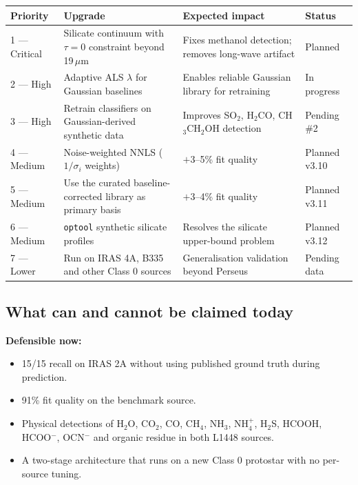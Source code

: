 \documentclass[11pt,a4paper]{article}
\newcommand{\um}{\,$\mu$m}
\newcommand{\code}[1]{\texttt{\small #1}}
\newcommand{\htwoo}{H$_2$O}
\newcommand{\cotwo}{CO$_2$}
\newcommand{\nhfour}{NH$_4^+$}
\newcommand{\ocn}{OCN$^-$}
\begin{document}
\begin{table}[H]
\centering
\small
\begin{tabular}{@{}L{2.4cm}L{4.8cm}L{4.9cm}L{2.3cm}@{}}
\toprule
\textbf{Priority} & \textbf{Upgrade} & \textbf{Expected impact} &
\textbf{Status} \\
 --- Critical & Silicate continuum with $\tau = 0$ constraint beyond
19\um & Fixes methanol detection; removes long-wave artifact & Planned \\
2 --- High & Adaptive ALS $\lambda$ for Gaussian baselines & Enables
reliable Gaussian library for retraining & In progress \\
3 --- High & Retrain classifiers on Gaussian-derived synthetic data &
Improves SO$_2$, H$_2$CO, CH$_3$CH$_2$OH detection & Pending \#2 \\
4 --- Medium & Noise-weighted NNLS ($1/\sigma_i$ weights) & $+3$--5\% fit
quality & Planned v3.10 \\
5 --- Medium & Use the curated baseline-corrected library as primary basis
& $+3$--4\% fit quality & Planned v3.11 \\
6 --- Medium & \code{optool} synthetic silicate profiles & Resolves the
silicate upper-bound problem & Planned v3.12 \\
7 --- Lower & Run on IRAS 4A, B335 and other Class 0 sources &
Generalisation validation beyond Perseus & Pending data \\
\bottomrule
\end{tabular}
\end{table}

\subsection{What can and cannot be claimed today}

\begin{goodbox}
\textbf{Defensible now:}
\begin{itemize}
  \item 15/15 recall on IRAS 2A without using published ground truth
        during prediction.
  \item 91\% fit quality on the benchmark source.
  \item Physical detections of \htwoo, \cotwo, CO, CH$_4$, NH$_3$,
        \nhfour, H$_2$S, HCOOH, HCOO$^-$, \ocn{} and organic residue in
        both L1448 sources.
  \item A two-stage architecture that runs on a new Class 0 protostar with
        no per-source tuning.
\end{itemize}
\end{goodbox}
\end{document}
